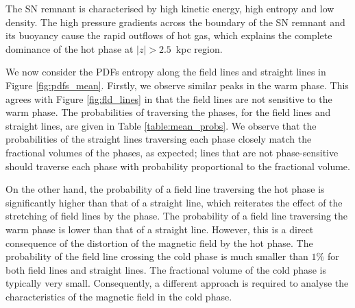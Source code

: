 \documentclass[useAMS,usenatbib]{mn2e}
\begin{document}
The SN remnant is characterised by high kinetic energy, high entropy and low density. The high pressure gradients across the boundary of the SN remnant and its buoyancy cause the rapid outflows of hot gas, which explains the complete dominance of the hot phase at $|z|>2.5$~kpc region.  

We now consider the PDFs entropy along the field lines and straight lines 
in Figure \ref{fig:pdfs_mean}. 
Firstly, we observe similar peaks in the warm phase. This agrees with Figure \ref{fig:fld_lines} in that the field lines are not sensitive to the warm phase. The probabilities of traversing the phases, for the field lines and straight lines, are given in Table \ref{table:mean_probs}. 
We observe that the probabilities of the straight lines traversing each phase closely match the fractional volumes of the phases, as expected; lines that are not phase-sensitive should traverse each phase with probability proportional to the fractional volume. 

On the other hand, the probability of a field line traversing the hot phase
is significantly higher than that of a straight line, which reiterates the 
effect of the stretching of field lines by the phase. 
The probability of a field line traversing the warm phase is lower than that 
of a straight line. 
However, this is a direct consequence of the distortion of the magnetic field by the hot phase. 
The probability of the field line crossing the cold phase is much smaller than $1\%$ for both field lines and straight lines. The fractional volume of the cold phase is typically very small. Consequently, a different approach is required to analyse the characteristics of the magnetic field in the cold phase.
\end{document}
